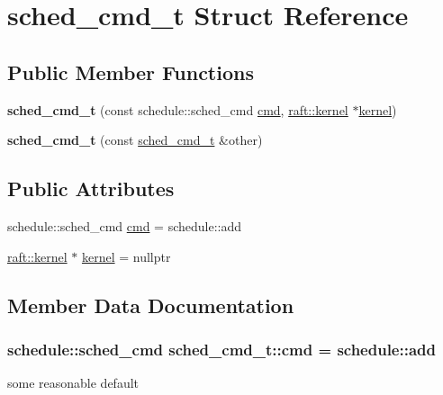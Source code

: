 \hypertarget{structsched__cmd__t}{}\section{sched\+\_\+cmd\+\_\+t Struct Reference}
\label{structsched__cmd__t}
\subsection*{Public Member Functions}
\begin{DoxyCompactItemize}
\item 
\hypertarget{structsched__cmd__t_a812b771fa21587d7b9888226e9ae0ce3}{}{\bfseries sched\+\_\+cmd\+\_\+t} (const schedule\+::sched\+\_\+cmd \hyperlink{structsched__cmd__t_ab4ecf8a7b468db75074c0ba1493caac7}{cmd}, \hyperlink{classraft_1_1kernel}{raft\+::kernel} $\ast$\hyperlink{structsched__cmd__t_a8f78af789430b7661f52de7365abcdbc}{kernel})\label{structsched__cmd__t_a812b771fa21587d7b9888226e9ae0ce3}

\item 
\hypertarget{structsched__cmd__t_a3a54e714aeba16cfe2faa5f2b082c8b8}{}{\bfseries sched\+\_\+cmd\+\_\+t} (const \hyperlink{structsched__cmd__t}{sched\+\_\+cmd\+\_\+t} \&other)\label{structsched__cmd__t_a3a54e714aeba16cfe2faa5f2b082c8b8}

\end{DoxyCompactItemize}
\subsection*{Public Attributes}
\begin{DoxyCompactItemize}
\item 
schedule\+::sched\+\_\+cmd \hyperlink{structsched__cmd__t_ab4ecf8a7b468db75074c0ba1493caac7}{cmd} = schedule\+::add
\item 
\hyperlink{classraft_1_1kernel}{raft\+::kernel} $\ast$ \hyperlink{structsched__cmd__t_a8f78af789430b7661f52de7365abcdbc}{kernel} = nullptr
\end{DoxyCompactItemize}


\subsection{Member Data Documentation}
\hypertarget{structsched__cmd__t_ab4ecf8a7b468db75074c0ba1493caac7}{}
\subsubsection[{cmd}]{\setlength{\rightskip}{0pt plus 5cm}schedule\+::sched\+\_\+cmd sched\+\_\+cmd\+\_\+t\+::cmd = schedule\+::add}\label{structsched__cmd__t_ab4ecf8a7b468db75074c0ba1493caac7}
some reasonable default \hypertarget{structsched__cmd__t_a8f78af789430b7661f52de7365abcdbc}{}
